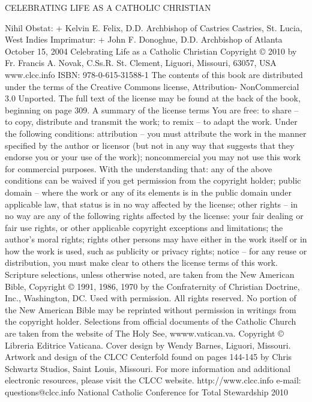 \documentclass[oneside]{book}
\begin{document}
\pagestyle{plain}


\frontmatter

CELEBRATING LIFE AS A CATHOLIC CHRISTIAN


Nihil Obstat: + Kelvin E. Felix, D.D. Archbishop of Castries Castries,
St. Lucia, West Indies Imprimatur: + John F. Donoghue, D.D. Archbishop of
Atlanta October 15, 2004 Celebrating Life as a Catholic Christian Copyright ©
2010 by Fr. Francis A. Novak, C.Ss.R. St. Clement, Liguori, Missouri, 63057, USA
www.clcc.info ISBN: 978-0-615-31588-1 The contents of this book are distributed
under the terms of the Creative Commons license, Attribution- NonCommercial 3.0
Unported. The full text of the license may be found at the back of the book,
beginning on page 309.  A summary of the license terms You are free: to share –
to copy, distribute and transmit the work; to remix – to adapt the work. Under
the following conditions: attribution – you must attribute the work in the
manner specified by the author or licensor (but not in any way that suggests
that they endorse you or your use of the work); noncommercial you may not use
this work for commercial purposes. With the understanding that: any of the above
conditions can be waived if you get permission from the copyright holder; public
domain – where the work or any of its elements is in the public domain under
applicable law, that status is in no way affected by the license; other rights –
in no way are any of the following rights affected by the license: your fair
dealing or fair use rights, or other applicable copyright exceptions and
limitations; the author’s moral rights; rights other persons may have either in
the work itself or in how the work is used, such as publicity or privacy rights;
notice – for any reuse or distribution, you must make clear to others the
license terms of this work.  Scripture selections, unless otherwise noted, are
taken from the New American Bible, Copyright © 1991, 1986, 1970 by the
Confraternity of Christian Doctrine, Inc., Washington, DC. Used with
permission. All rights reserved. No portion of the New American Bible may be
reprinted without permission in writings from the copyright holder.  Selections
from official documents of the Catholic Church are taken from the website of The
Holy See, wwww.vatican.va. Copyright © Libreria Editrice Vaticana.  Cover design
by Wendy Barnes, Liguori, Missouri. Artwork and design of the CLCC Centerfold
found on pages 144-145 by Chris Schwartz Studios, Saint Louis, Missouri.  For
more information and additional electronic resources, please visit the CLCC
website.  http://www.clcc.info e-mail: questions@clcc.info National Catholic
Conference for Total Stewardship 2010
\end{document}
